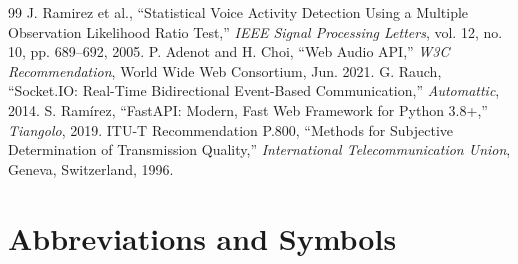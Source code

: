 \documentclass[12pt,a4paper]{report}
\begin{document}
\begin{thebibliography}{99}
 J. Ramirez et al., ``Statistical Voice Activity Detection Using a Multiple Observation Likelihood Ratio Test,'' \textit{IEEE Signal Processing Letters}, vol. 12, no. 10, pp. 689--692, 2005.
 P. Adenot and H. Choi, ``Web Audio API,'' \textit{W3C Recommendation}, World Wide Web Consortium, Jun. 2021.
 G. Rauch, ``Socket.IO: Real-Time Bidirectional Event-Based Communication,'' \textit{Automattic}, 2014.
 S. Ram\'irez, ``FastAPI: Modern, Fast Web Framework for Python 3.8+,'' \textit{Tiangolo}, 2019.
 ITU-T Recommendation P.800, ``Methods for Subjective Determination of Transmission Quality,'' \textit{International Telecommunication Union}, Geneva, Switzerland, 1996.
\end{thebibliography}

\newpage
\appendix
\chapter{Abbreviations and Symbols}
\end{document}
